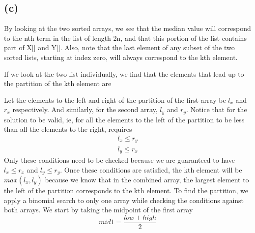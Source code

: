     	\subsection*{(c)}
    		By looking at the two sorted arrays, we see that the median value will correspond to the nth term in the list of length 2n, and that this portion of the list contains part of X[\:] and Y[\:]. Also, note that the last element of any subset of the two sorted lists, starting at index zero, will always correspond to the kth element. \\
    		\begin{center}\leavevmode\vbox{
    			}
    	\end{center}
    	\noindent
    		If we look at the two list individually, we find that the elements that lead up to the partition of the kth element are \\
    		\begin{center}\leavevmode\vbox{
    			}
    	\end{center}
    	\noindent
    	Let the elements to the left and right of the partition of the first array be $l_x$ and $r_x$ respectively. And similarly, for the second array, $l_y$ and $r_y$. Notice that for the solution to be valid, ie, for all the elements to the left of the partition to be less than all the elements to the right, requires
    	\begin{equation*}
    		\begin{split}
    			l_x \leq r_y \\
    			l_y \leq r_x
    		\end{split}
    	\end{equation*}
    	Only these conditions need to be checked because we are guaranteed to have $l_x \leq r_x$ and $l_y \leq r_y$. Once these conditions are satisfied, the kth element will be $max(l_x, l_y)$ because we know that in the combined array, the largest element to the left of the partition corresponds to the kth element. To find the partition, we apply a binomial search to only one array while checking the conditions against both arrays. We start by taking the midpoint of the first array
    	\begin{equation*}
    		mid1 = \frac{low + high}{2}
    	\end{equation*}
